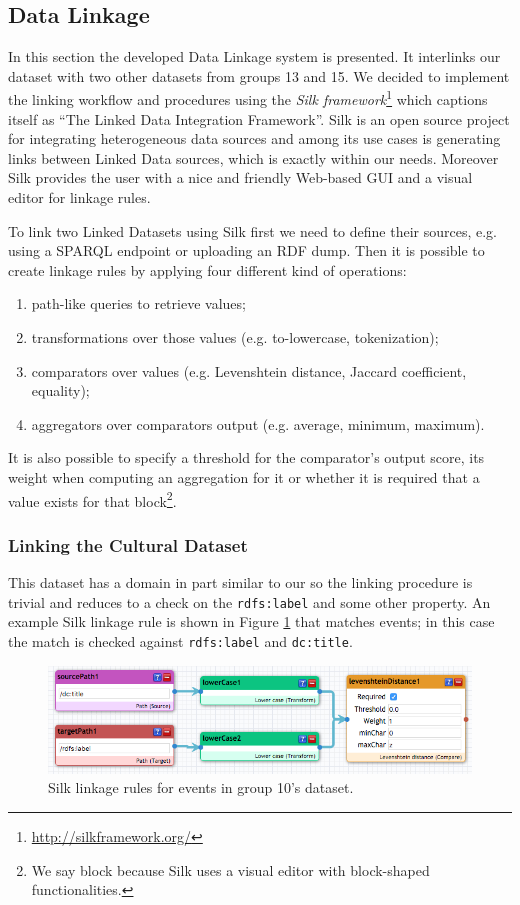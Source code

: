 \documentclass[runningheads,a4paper]{../../StyleFiles/llncs}
\begin{document}
\subsection{Data Linkage}
In this section the developed Data Linkage system is presented.
It interlinks our dataset with two other datasets from groups 13 and 15. We
decided to implement the linking workflow and procedures using the
\textit{Silk framework}\footnote{\url{http://silkframework.org/}} which captions
itself as ``The Linked Data Integration Framework''. Silk is an open source
project for integrating heterogeneous data sources and among its use cases is
generating links between Linked Data sources, which is exactly within our needs.
Moreover Silk provides the user with a nice and friendly Web-based GUI and a visual
editor for linkage rules.

To link two Linked Datasets using Silk first we need to define their sources,
e.g. using a SPARQL endpoint or uploading an RDF dump. Then it is possible to
create linkage rules by applying four different kind of operations:
\begin{enumerate}
	\item path-like queries to retrieve values;
	\item transformations over those values (e.g. to-lowercase, tokenization);
	\item comparators over values (e.g. Levenshtein distance, Jaccard
		coefficient, equality);
	\item aggregators over comparators output (e.g. average, minimum, maximum).
\end{enumerate}
It is also possible to specify a threshold for the comparator's output score,
its weight when computing an aggregation for it or whether it is required that a
value exists for that block\footnote{We say block because Silk uses a visual
editor with block-shaped functionalities.}.

\subsubsection{Linking the Cultural Dataset}
This dataset has a domain in part similar to our so the linking procedure
is trivial and reduces to a check on the \texttt{rdfs:label} and some other
property. An example Silk linkage rule is shown in Figure \ref{fig:link_event_g10}
that matches events; in this case the match is checked against
\texttt{rdfs:label} and \texttt{dc:title}.

\begin{figure}[h]
	\centering
	\includegraphics[width=1\textwidth]{img/link_event_g10.png}
	\caption{Silk linkage rules for events in group 10's dataset.}
	\label{fig:link_event_g10}
\end{figure}
\end{document}

